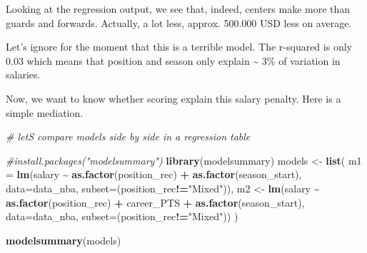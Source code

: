 \documentclass[
]{book}
\newenvironment{Shaded}{\begin{snugshade}}{\end{snugshade}}
\newcommand{\AttributeTok}[1]{\textcolor[rgb]{0.13,0.29,0.53}{#1}}
\newcommand{\CommentTok}[1]{\textcolor[rgb]{0.56,0.35,0.01}{\textit{#1}}}
\newcommand{\FunctionTok}[1]{\textcolor[rgb]{0.13,0.29,0.53}{\textbf{#1}}}
\newcommand{\NormalTok}[1]{#1}
\newcommand{\OtherTok}[1]{\textcolor[rgb]{0.56,0.35,0.01}{#1}}
\newcommand{\SpecialCharTok}[1]{\textcolor[rgb]{0.81,0.36,0.00}{\textbf{#1}}}
\newcommand{\StringTok}[1]{\textcolor[rgb]{0.31,0.60,0.02}{#1}}
\begin{document}
Looking at the regression output, we see that, indeed, centers make more than guards and forwards. Actually, a lot less, approx. 500.000 USD less on average.

Let's ignore for the moment that this is a terrible model. The r-squared is only 0.03 which means that position and season only explain \textasciitilde{} 3\% of variation in salaries.

Now, we want to know whether scoring explain this salary penalty. Here is a simple mediation.

\begin{Shaded}
\begin{Highlighting}[]
\CommentTok{\# let\textquotesingle{}S compare models side by side in a regression table}

\CommentTok{\#install.packages("modelsummary")}
\FunctionTok{library}\NormalTok{(modelsummary)}
\NormalTok{models }\OtherTok{\textless{}{-}} \FunctionTok{list}\NormalTok{(}
  \AttributeTok{m1 =} \FunctionTok{lm}\NormalTok{(salary }\SpecialCharTok{\textasciitilde{}} \FunctionTok{as.factor}\NormalTok{(position\_rec) }\SpecialCharTok{+} \FunctionTok{as.factor}\NormalTok{(season\_start), }\AttributeTok{data=}\NormalTok{data\_nba, }\AttributeTok{subset=}\NormalTok{(position\_rec}\SpecialCharTok{!=}\StringTok{"Mixed"}\NormalTok{)),}
\NormalTok{  m2 }\OtherTok{\textless{}{-}} \FunctionTok{lm}\NormalTok{(salary }\SpecialCharTok{\textasciitilde{}} \FunctionTok{as.factor}\NormalTok{(position\_rec) }\SpecialCharTok{+}\NormalTok{ career\_PTS }\SpecialCharTok{+} \FunctionTok{as.factor}\NormalTok{(season\_start), }\AttributeTok{data=}\NormalTok{data\_nba, }\AttributeTok{subset=}\NormalTok{(position\_rec}\SpecialCharTok{!=}\StringTok{"Mixed"}\NormalTok{))}
\NormalTok{)}

\FunctionTok{modelsummary}\NormalTok{(models)}
\end{Highlighting}
\end{Shaded}
\end{document}
